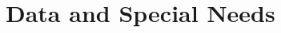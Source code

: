 \documentclass[12pt,a4paper]{article}
\begin{document}









\section{Data and Special Needs}
\label{sec:data}










\end{document}

